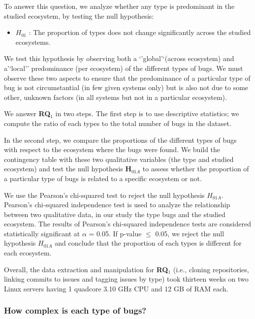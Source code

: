 \documentclass[natbib]{svjour3}
\providecommand{\tightlist}{%
  \setlength{\itemsep}{0pt}\setlength{\parskip}{0pt}}
\begin{document}
To answer this question, we analyze whether any type is predominant in
the studied ecosystem, by testing the null hypothesis:

\begin{itemize}
\tightlist
\item
  \(H_{01}\) : The proportion of types does not change significantly
  across the studied ecosystems.
\end{itemize}

We test this hypothesis by observing both a `'global'`(across ecosystem)
and a'`local'' predominance (per ecosystem) of the different types of
bugs. We must observe these two aspects to ensure that the predominance
of a particular type of bug is not circumstantial (in few given systems
only) but is also not due to some other, unknown factors (in all systems
but not in a particular ecosystem).

We answer \textbf{RQ\(_1\)} in two steps. The first step is to use
descriptive statistics; we compute the ratio of each types to the total
number of bugs in the dataset.

In the second step, we compare the proportions of the different types of
bugs with respect to the ecosystem where the bugs were found. We build
the contingency table with these two qualitative variables (the type and
studied ecosystem) and test the null hypothesis \textbf{H\(_{01A}\)} to
assess whether the proportion of a particular type of bugs is related to
a specific ecosystem or not.

We use the Pearson's chi-squared test to reject the null hypothesis
\(H_{01A}\). Pearson's chi-squared independence test is used to analyze
the relationship between two qualitative data, in our study the type
bugs and the studied ecosystem. The results of Pearson's chi-squared
independence tests are considered statistically significant at
\(\alpha\) = 0.05. If p-value \(\le\) 0.05, we reject the null
hypothesis \(H_{01A}\) and conclude that the proportion of each types is
different for each ecosystem.

Overall, the data extraction and manipulation for \textbf{RQ\(_1\)}
(i.e., cloning repositories, linking commits to issues and tagging
issues by type) took thirteen weeks on two Linux servers having 1
quadcore 3.10 GHz CPU and 12 GB of RAM each.

\subsubsection{How complex is each type of
bugs?}\label{how-complex-is-each-type-of-bugs}
\end{document}
